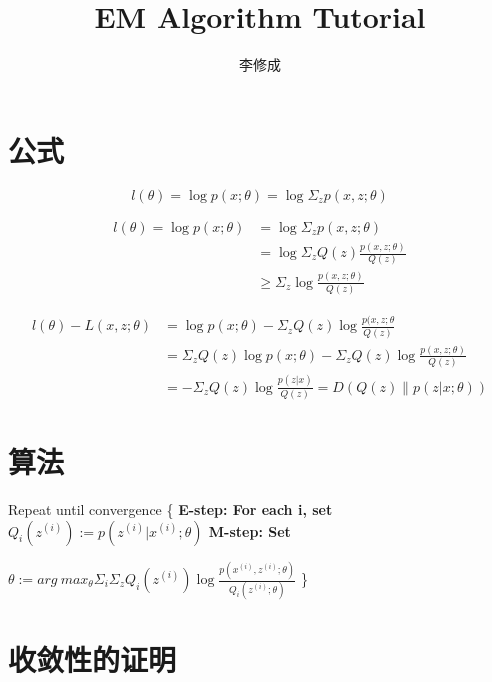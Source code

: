 \documentclass[a4paper,14pt]{report}
\title{EM Algorithm Tutorial}
\author{李修成}
\date{}
\begin{document}
\maketitle
\section{公式}
\begin{equation}
l(\theta)=\log p(x;\theta) = \log  \Sigma _{z}p(x,z;\theta)
\end{equation}

\begin{equation}
\begin{split}
l(\theta)=\log p(x;\theta) &=  \log  \Sigma_{z}p(x,z;\theta) \\
			   &= \log \Sigma_{z}Q(z)\frac{p(x,z;\theta)}{Q(z)} \\
                           &\geq \Sigma_{z}\log \frac{p(x,z;\theta)}{Q(z)} 
\end{split}
\end{equation}

\begin{equation}
\begin{split}
l(\theta)-L(x,z;\theta) &= \log p(x;\theta)-\Sigma_{z}Q(z)\log \frac{p(x,z;\theta}{Q(z)} \\
                        &= \Sigma_{z} Q(z) \log p(x;\theta)-\Sigma_{z}Q(z)\log \frac{p(x,z;\theta)}{Q(z)} \\
			&= -\Sigma_{z}Q(z)\log\frac{p(z|x)}{Q(z)} = D(Q(z) \parallel p(z|x; \theta ))
\end{split}
\end{equation}

\section{算法}
\begin{codebox}
    \li Repeat until convergence \{
        \Do
    \li      \bf{E-step}: 
    \li			For each i, set
             \Do 
    \li                   $Q_{i}(z^{(i)}) := p(z^{(i)}|x^{(i)};\theta)$
             \End
    \li      \bf{M-step}:
    \li			 Set
             \Do

    \li			 $\theta := arg\ max_{\theta}  \Sigma_{i} \Sigma_{z}Q_{i}(z^{(i)}) \log \frac{p(x^{(i)},z^{(i)};\theta)}{Q_{i}(z^{(i)};\theta)}$
             \End
        \End
    \li \}
\end{codebox}

\section{收敛性的证明}
\end{document}
